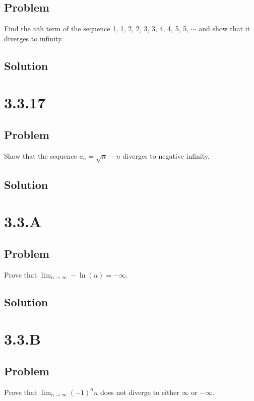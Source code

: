 \documentclass[12pt]{article}
\begin{document}
\subsection*{Problem}
Find the $n$th term of the sequence 1, 1, 2, 2, 3, 3, 4, 4, 5, 5, $\cdots$ and show that it diverges to infinity.

\subsection*{Solution}



\section*{3.3.17}

\subsection*{Problem}
Show that the sequence $a_n = \sqrt{n} - n$ diverges to negative infinity.

\subsection*{Solution}



\section*{3.3.A}

\subsection*{Problem}
Prove that $\lim_{n \to \infty} -\ln(n) = -\infty$.

\subsection*{Solution}



\section*{3.3.B}

\subsection*{Problem}
Prove that $\lim_{n \to \infty} (-1)^{n} n$ does not diverge to either $\infty$ or $-\infty$.
\end{document}

